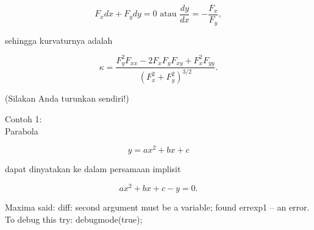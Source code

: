 \documentclass[a4paper,10pt]{article}
\begin{document}
\begin{eulernotebook}
\begin{eulercomment}
\begin{eulercomment}
\begin{eulercomment}
\begin{eulercomment}
\begin{eulercomment}
\begin{eulercomment}
\begin{eulercomment}
\begin{eulercomment}
\begin{eulercomment}
\begin{eulercomment}
\begin{eulercomment}
\begin{eulercomment}
\begin{eulercomment}
\begin{eulercomment}
\begin{eulercomment}
\begin{eulercomment}
\begin{eulercomment}
\end{eulercomment}
\begin{eulerformula}
\[
F_x dx+ F_y dy = 0\text{ atau } \frac{dy}{dx}=-\frac{F_x}{F_y},
\]
\end{eulerformula}
\begin{eulercomment}
sehingga kurvaturnya adalah

\end{eulercomment}
\begin{eulerformula}
\[
\kappa =\frac {F_y^2F_{xx}-2F_xF_yF_{xy}+F_x^2F_{yy}}{\left(F_x^2+F_y^2\right)^{3/2}}.
\]
\end{eulerformula}
\begin{eulercomment}
(Silakan Anda turunkan sendiri!)

Contoh 1:\\
Parabola 

\end{eulercomment}
\begin{eulerformula}
\[
y=ax^2+bx+c
\]
\end{eulerformula}
\begin{eulercomment}
dapat dinyatakan ke dalam persamaan implisit

\end{eulercomment}
\begin{eulerformula}
\[
ax^2+bx+c-y=0.
\]
\end{eulerformula}
\begin{euleroutput}
  Maxima said:
  diff: second argument must be a variable; found errexp1
   -- an error. To debug this try: debugmode(true);
  

\end{euleroutput}
\end{eulercomment}
\end{eulercomment}
\end{eulercomment}
\end{eulercomment}
\end{eulercomment}
\end{eulercomment}
\end{eulercomment}
\end{eulercomment}
\end{eulercomment}
\end{eulercomment}
\end{eulercomment}
\end{eulercomment}
\end{eulercomment}
\end{eulercomment}
\end{eulercomment}
\end{eulercomment}
\end{eulernotebook}
\end{document}
